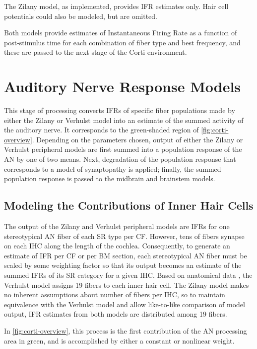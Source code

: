 The Zilany model, as implemented, provides IFR estimates only.  Hair cell potentials could also be modeled, but are omitted.

Both models provide estimates of Instantaneous Firing Rate as a function of post-stimulus time for each combination of fiber type and best frequency, and these are passed to the next stage of the Corti environment.


\section{Auditory Nerve Response Models} %
\label{sec:auditory_nerve_response_models}
This stage of processing converts IFRs of specific fiber populations made by either the Zilany or Verhulst model into an estimate of the summed activity of the auditory nerve. It corresponds to the green-shaded region of \autoref{fig:corti-overview}.  Depending on the parameters chosen, output of either the Zilany or Verhulst peripheral models are first summed into a population response of the AN by one of two means.  Next, degradation of the population response that corresponds to a model of synaptopathy is applied; finally, the summed population response is passed to the midbrain and brainstem models.

\subsection{Modeling the Contributions of Inner Hair Cells} %
\label{sub:contributions_to_the_response_by_inner_hair_cells}
The output of the Zilany and Verhulst peripheral models are IFRs for one stereotypical AN fiber of each SR type per CF.   However, tens of fibers synapse on each IHC along the length of the cochlea.  Consequently, to generate an estimate of IFR per CF or per BM section, each stereotypical AN fiber must be scaled by some weighting factor so that its output becomes an estimate of the summed IFRs of its SR category for a given IHC.  Based on anatomical data \citep{Liberman1978AuditoryNerve}, the Verhulst model assigns 19 fibers to each inner hair cell.  The Zilany model makes no inherent assumptions about number of fibers per IHC, so to maintain equivalence with the Verhulst model and allow like-to-like comparison of model output, IFR estimates from both models are distributed among 19 fibers.

In \autoref{fig:corti-overview}, this process is the first contribution of the AN processing area in green, and is accomplished by either a constant or nonlinear weight.

